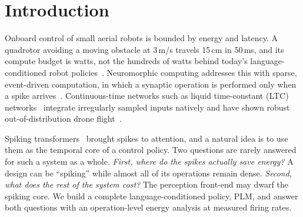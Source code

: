 \documentclass[12pt]{article}
\begin{document}
\section{Introduction}
Onboard control of small aerial robots is bounded by energy and latency. A quadrotor avoiding a moving obstacle at 3\,m/s travels 15\,cm in 50\,ms, and its compute budget is watts, not the hundreds of watts behind today's language-conditioned robot policies~\citep{brohan2023rt2,kim2024openvla,black2024pi0}. Neuromorphic computing addresses this with sparse, event-driven computation, in which a synaptic operation is performed only when a spike arrives~\citep{roy2019towards,davies2018loihi}. Continuous-time networks such as liquid time-constant (LTC) networks~\citep{hasani2021ltc,hasani2022cfc} integrate irregularly sampled inputs natively and have shown robust out-of-distribution drone flight~\citep{chahine2023robust,lechner2020ncp}.

Spiking transformers~\citep{zhou2023spikformer,yao2023spikedriven} brought spikes to attention, and a natural idea is to use them as the temporal core of a control policy. Two questions are rarely answered for such a system as a whole. \emph{First, where do the spikes actually save energy?} A design can be ``spiking'' while almost all of its operations remain dense. \emph{Second, what does the rest of the system cost?} The perception front-end may dwarf the spiking core. We build a complete language-conditioned policy, PLM, and answer both questions with an operation-level energy analysis at measured firing rates.
\end{document}
